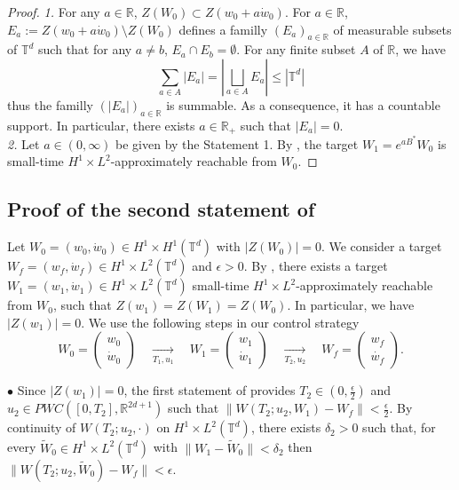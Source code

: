 \documentclass[a4paper]{article}
\theoremstyle{plain}
\newcommand{\T}{\mathbb{T}}
\newcommand{\R}{\mathbb{R}}
\begin{document}
\begin{proof}
\emph{1.} For any $a \in \R$, $Z(W_0) \subset Z(w_0+a\dot{w}_0)$.
For $a \in \R$, $E_a :=Z(w_0+a\dot{w}_0) \setminus Z(W_0)$ defines a familly $(E_a)_{a\in\R}$ of measurable subsets of $\T^d$ such that for any $a \neq b$, $E_a \cap E_b = \emptyset$. For any finite subset $A$ of $\R$, we have
$$\sum_{a \in A} |E_{a}| = \left| \underset{a \in A}{\bigsqcup} E_a \right| \leq | \T^d|$$
thus the familly $(|E_a|)_{a\in\R}$ is summable. As a consequence, it has a countable support. In particular, there exists $a \in \R_+$ such that $|E_a|=0$.
\\
\emph{2.} Let $a \in (0,\infty)$ be given by the Statement 1. By , the target $W_1=e^{aB^*}W_0$ is small-time $H^1 \times L^2$-approximately reachable from $W_0$.
\end{proof}

\subsection{Proof of the second statement of }    
\label{subsec:STAC_2}


Let $W_0=(w_0,\dot{w}_0) \in H^1 \times H^1(\T^d)$ with $|Z(W_0)|=0$. We consider a target $W_f=(w_f,\dot{w}_f) \in H^1 \times L^2(\T^d)$ and $\epsilon>0$. By , there exists a target $W_1=(w_1,\dot{w}_1) \in H^1 \times L^2(\T^d)$ small-time $H^1 \times L^2$-approximately reachable from $W_0$, such that $Z(w_1)=Z(W_1)=Z(W_0)$. In particular, we have $|Z(w_1)|=0$. We use the following steps in our control strategy
$$W_0=\begin{pmatrix}
    w_0 \\ \dot{w}_0
\end{pmatrix}
\quad \xrightarrow[T_1,u_1]{} \quad
W_1=\begin{pmatrix}
    w_1 \\ \dot{w}_1
\end{pmatrix}
\quad \xrightarrow[T_2,u_2]{} \quad
W_f=\begin{pmatrix}
    w_f \\ \dot{w_f}
\end{pmatrix}.$$

\noindent $\bullet$ Since $|Z(w_1)|=0$, the first statement of  provides $T_2 \in (0,\frac{\epsilon}{2})$ and\newline$u_2 \in PWC([0,T_2],\R^{2d+1})$ such that
$\| W(T_2;u_2,W_1)-W_f\|<\frac{\epsilon}{2}$. By continuity of $W(T_2;u_2,\cdot)$ on $H^1 \times L^2(\T^d)$, there exists $\delta_2>0$ such that, for every $\widetilde{W}_0 \in H^1 \times L^2(\T^d)$ with $\|W_1-\widetilde{W}_0\|<\delta_2$ then $\| W(T_2;u_2,\widetilde{W}_0)-W_f\|<\epsilon$.
\end{document}
